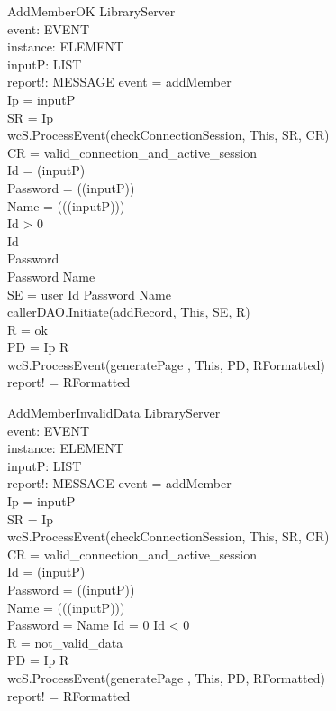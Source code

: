 \begin{schema}{AddMemberOK} 
\Delta LibraryServer \\
event: EVENT \\
instance: ELEMENT \\
inputP: LIST \\
report!: MESSAGE
\where event = addMember \\
Ip = \head inputP \\
SR = \lseq Ip \rseq \\ 
wcS.ProcessEvent(checkConnectionSession, This, SR, CR) \\
CR = valid\_connection\_and\_active\_session \\
Id = \head (\tail inputP) \\
Password = \head (\tail (\tail inputP)) \\
Name = \head (\tail (\tail (\tail inputP))) \\
Id > 0 \\
Id  \\
Password  \\
Password \neq Name \\
SE = \lseq user Id Password Name \rseq \\
callerDAO.Initiate(addRecord, This, SE, R) \\
R = ok \\ 
PD = \lseq Ip R \rseq \\
wcS.ProcessEvent(generatePage , This, PD, RFormatted) \\
report! = RFormatted
\end{schema}

\begin{schema}{AddMemberInvalidData}
\Delta LibraryServer \\
event: EVENT \\
instance: ELEMENT \\
inputP: LIST \\
report!: MESSAGE
\where event = addMember \\
Ip = \head inputP \\
SR = \lseq Ip \rseq \\ 
wcS.ProcessEvent(checkConnectionSession, This, SR, CR) \\
CR = valid\_connection\_and\_active\_session \\
Id = \head (\tail inputP) \\
Password = \head (\tail (\tail inputP)) \\
Name = \head (\tail (\tail (\tail inputP))) \\
Password = Name \lor Id = 0 \lor Id < 0 \\
R = not\_valid\_data \\
PD = \lseq Ip R \rseq \\
wcS.ProcessEvent(generatePage , This, PD, RFormatted) \\
report! = RFormatted
\end{schema}

